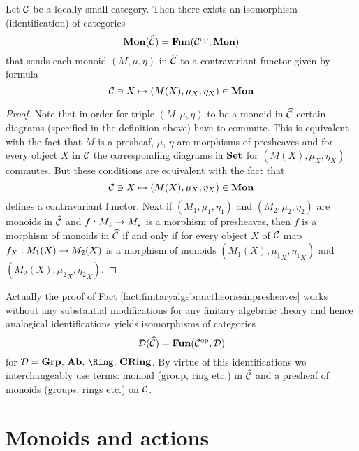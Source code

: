 \begin{fact}\label{fact:finitaryalgebraictheoriesinpresheaves}
Let ${\mathcal C}$ be a locally small category. Then there exists an isomorphism (identification) of categories
$$\mathbf{Mon}(\widehat{{\mathcal C}}) = \mathbf{Fun}({\mathcal C}^{\mathrm{op}},\mathbf{Mon})$$
that sends each monoid $(M,\mu,\eta)$ in $\widehat{{\mathcal C}}$ to a contravariant functor given by formula 
$${\mathcal C}\ni X\mapsto (M(X),\mu_X,\eta_X)\in \mathbf{Mon}$$
\end{fact}
\begin{proof}
Note that in order for triple $(M,\mu,\eta)$ to be a monoid in $\widehat{{\mathcal C}}$ certain diagrams (specified in the definition above) have to commute. This is equivalent with the fact that $M$ is a presheaf, $\mu$, $\eta$ are morphisms of presheaves and for every object $X$ in ${\mathcal C}$ the corresponding diagrams in $\mathbf{Set}$ for $(M(X),\mu_X,\eta_X)$ commutes. But these conditions are equivalent with the fact that 
$${\mathcal C}\ni X\mapsto (M(X),\mu_X,\eta_X)\in \mathbf{Mon}$$
defines a contravariant functor. Next if $(M_1,\mu_1,\eta_1)$ and $(M_2,\mu_2,\eta_2)$ are monoids in $\widehat{{\mathcal C}}$ and $f:M_1\rightarrow M_2$ is a morphism of presheaves, then $f$ is a morphism of monoids in $\widehat{{\mathcal C}}$ if and only if for every object $X$ of ${\mathcal C}$ map $f_X:M_1(X)\rightarrow M_2(X)$ is a morphism of monoids $(M_1(X),{\mu_1}_X,{\eta_1}_X)$ and $(M_2(X),{\mu_2}_X,{\eta_2}_X)$.
\end{proof}

\begin{remark}\label{remark:finitaryalgebraictheoriesinpresheaves}
Actually the proof of Fact \ref{fact:finitaryalgebraictheoriesinpresheaves} works without any substantial modifications for any finitary algebraic theory and hence analogical identifications yields isomorphisms of categories
$${\mathcal D}(\widehat{{\mathcal C}}) = \mathbf{Fun}({\mathcal C}^{\mathrm{op}},{\mathcal D})$$
for $\cD = \Grp,\,\Ab,\,\Ring,\,\CRing$.
By virtue of this identifications we interchangeably use terms: monoid (group, ring etc.) in $\widehat{{\mathcal C}}$ and a presheaf of monoids (groups, rings etc.) on ${\mathcal C}$.
\end{remark}




\section{Monoids and actions}\label{section:monoidsandtheiractions}

